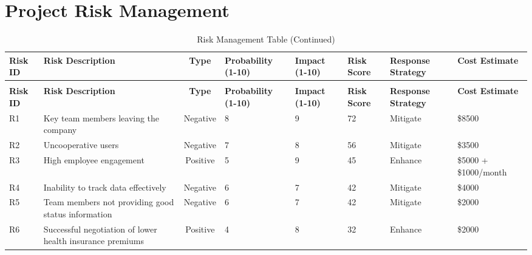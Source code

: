 \chapter{Project Risk Management}
\begin{longtable}{|p{1cm}|p{2.5cm}|c|p{1.8cm}|p{1.4cm}|p{1cm}|p{1.8cm}|p{2cm}|}
    \caption{Risk Management Table} 
    \label{tab:rmt} \\
    \hline
    \textbf{Risk ID} & \textbf{Risk Description} & \textbf{Type} & \textbf{Probability (1-10)} & \textbf{Impact (1-10)} & \textbf{Risk Score} & \textbf{Response Strategy} & \textbf{Cost Estimate} \\
    \hline
    \endfirsthead
    \caption[]{Risk Management Table (Continued)} \\
    \hline
    \textbf{Risk ID} & \textbf{Risk Description} & \textbf{Type} & \textbf{Probability (1-10)} & \textbf{Impact (1-10)} & \textbf{Risk Score} & \textbf{Response Strategy} & \textbf{Cost Estimate} \\
    \hline
    \endhead
    \hline
    \endfoot
    \hline
    \endlastfoot
    R1 & Key team members leaving the company & Negative & 8 & 9 & 72 & Mitigate & \$8500 \\
    \hline
    R2 & Uncooperative users & Negative & 7 & 8 & 56 & Mitigate & \$3500 \\
    \hline
    R3 & High employee engagement & Positive & 5 & 9 & 45 & Enhance & \$5000 + \$1000/month \\
    \hline
    R4 & Inability to track data effectively & Negative & 6 & 7 & 42 & Mitigate & \$4000 \\
    \hline
    R5 & Team members not providing good status information & Negative & 6 & 7 & 42 & Mitigate & \$2000 \\
    \hline
    R6 & Successful negotiation of lower health insurance premiums & Positive & 4 & 8 & 32 & Enhance & \$2000 \\
    \hline
\end{longtable}

